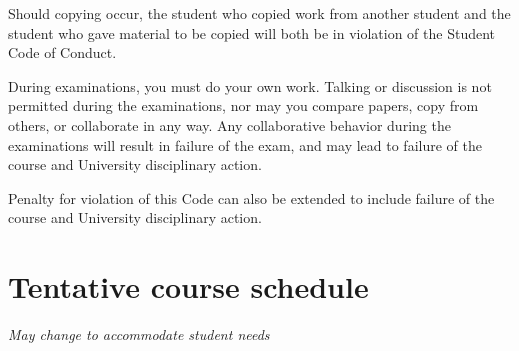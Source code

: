 \documentclass[a4paper]{article}
\begin{document}
Should copying occur, the student who copied work from another student and the student who gave material to be copied will both be in violation of the Student Code of Conduct. 

During examinations, you must do your own work. Talking or discussion is not permitted during the examinations, nor may you compare papers, copy from others, or collaborate in any way. Any collaborative behavior during the examinations will result in failure of the exam, and may lead to failure of the course and University disciplinary action.

Penalty for violation of this Code can also be extended to include failure of the course and University disciplinary action. 

\newpage
\section{Tentative course schedule }

{\it May change to accommodate student needs}
\end{document}
